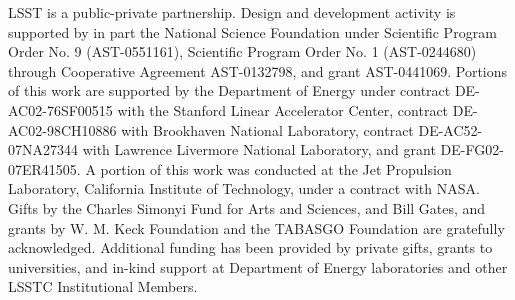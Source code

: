 \documentclass[11pt,twoside]{article}
\begin{document}
\acknowledgements 

LSST is a public-private partnership.  Design and development activity is
supported by in part the National Science Foundation under Scientific
Program Order No. 9 (AST-0551161), Scientific Program Order No. 1
(AST-0244680) through Cooperative Agreement AST-0132798, and grant AST-0441069. 
Portions of this work are supported by the Department of Energy under contract
DE-AC02-76SF00515 with the Stanford Linear Accelerator Center, contract
DE-AC02-98CH10886 with Brookhaven National Laboratory, contract
DE-AC52-07NA27344 with Lawrence Livermore National Laboratory, and grant
DE-FG02-07ER41505. A portion of this work was conducted at the Jet Propulsion 
Laboratory, California Institute of Technology, under a contract with NASA.
Gifts by the Charles Simonyi Fund for Arts and Sciences,
and Bill Gates, and grants by W. M. Keck Foundation and the TABASGO Foundation
are gratefully acknowledged. Additional funding has been provided by private gifts, grants 
to universities, and in-kind support at Department of Energy laboratories and other 
LSSTC Institutional Members.  

\end{document}
